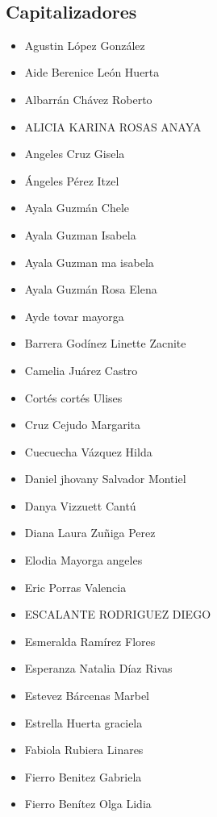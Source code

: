 

\begin{spacing}{0.5}
\ \\ 
\justifying
\begin{paracol}{2}
\section*{Capitalizadores}
\begin{itemize}
\item Agustin López González
\item Aide Berenice León Huerta
\item Albarrán Chávez Roberto
\item ALICIA KARINA ROSAS ANAYA
\item Angeles Cruz Gisela
\item Ángeles Pérez Itzel
\item Ayala Guzmán Chele
\item Ayala Guzman Isabela
\item Ayala Guzman ma isabela
\item Ayala Guzmán Rosa Elena
\item Ayde tovar mayorga
\item Barrera Godínez Linette Zacnite
\item Camelia Juárez Castro
\item Cortés cortés Ulises
\item Cruz Cejudo Margarita
\item Cuecuecha Vázquez Hilda
\item Daniel jhovany Salvador Montiel
\item Danya Vizzuett Cantú
\item Diana Laura Zuñiga Perez
\item Elodia Mayorga angeles
\item Eric Porras Valencia
\item ESCALANTE RODRIGUEZ DIEGO
\item Esmeralda Ramírez Flores
\item Esperanza Natalia Díaz Rivas
\item Estevez Bárcenas Marbel
\item Estrella Huerta graciela
\item Fabiola Rubiera Linares
\item Fierro Benitez Gabriela
\item Fierro Benítez Olga Lidia

\end{itemize}
\end{paracol}
\end{spacing}
